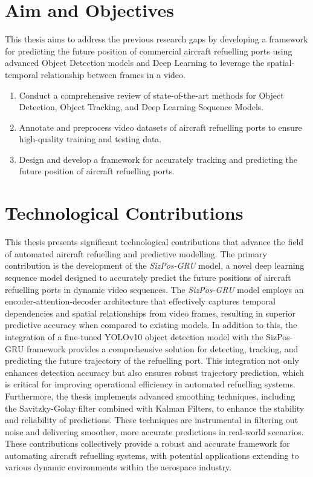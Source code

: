 \documentclass[12pt,oneside]{book} %
\begin{document}
\section{Aim and Objectives}
This thesis aims to address the previous research gaps by developing a
framework for predicting the future position of commercial aircraft refuelling
ports using advanced Object Detection models and Deep Learning to leverage the
spatial-temporal relationship between frames in a video.
\begin{enumerate}
    \item Conduct a comprehensive review of state-of-the-art methods for Object
          Detection, Object Tracking, and Deep Learning Sequence Models.
    \item Annotate and preprocess video datasets of aircraft refuelling ports to ensure
          high-quality training and testing data.
    \item Design and develop a framework for accurately tracking and predicting the
          future position of aircraft refuelling ports.
\end{enumerate}

\section{Technological Contributions}
This thesis presents significant technological contributions that advance the
field of automated aircraft refuelling and predictive modelling. The primary
contribution is the development of the \textit{SizPos-GRU} model, a novel deep
learning sequence model designed to accurately predict the future positions of
aircraft refuelling ports in dynamic video sequences. The \textit{SizPos-GRU}
model employs an encoder-attention-decoder architecture that effectively
captures temporal dependencies and spatial relationships from video frames,
resulting in superior predictive accuracy when compared to existing models. In
addition to this, the integration of a fine-tuned YOLOv10 object detection
model with the SizPos-GRU framework provides a comprehensive solution for
detecting, tracking, and predicting the future trajectory of the refuelling
port. This integration not only enhances detection accuracy but also ensures
robust trajectory prediction, which is critical for improving operational
efficiency in automated refuelling systems. Furthermore, the thesis implements
advanced smoothing techniques, including the Savitzky-Golay filter combined
with Kalman Filters, to enhance the stability and reliability of predictions.
These techniques are instrumental in filtering out noise and delivering
smoother, more accurate predictions in real-world scenarios. These
contributions collectively provide a robust and accurate framework for
automating aircraft refuelling systems, with potential applications extending
to various dynamic environments within the aerospace industry.
\end{document}
